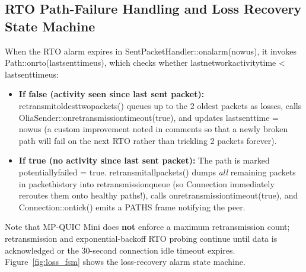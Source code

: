 \documentclass[10pt,a4paper]{article}
\newcommand{\codeul}{\textunderscore\hspace{0pt}}
\DeclareRobustCommand{\code}[1]{{\ttfamily\let\_\codeul #1}}
\begin{document}
\subsection{RTO Path-Failure Handling and Loss Recovery State Machine}
When the RTO alarm expires in \code{SentPacketHandler::on\_alarm(now\_us)}, it invokes \code{Path::on\_rto(last\_sent\_time\_us)}, which checks whether \code{last\_network\_activity\_time < last\_sent\_time\_us}:
\begin{itemize}
    \item \textbf{If false (activity seen since last sent packet):} \code{retransmit\_oldest\_two\_packets()} queues up to the 2 oldest packets as losses, calls \code{OliaSender::on\_retransmission\_timeout(true)}, and updates \code{last\_sent\_time = now\_us} (a custom improvement noted in comments so that a newly broken path will fail on the next RTO rather than trickling 2 packets forever).
    \item \textbf{If true (no activity since last sent packet):} The path is marked \code{potentially\_failed = true}. \code{retransmit\_all\_packets()} dumps \emph{all} remaining packets in \code{packet\_history} into \code{retransmission\_queue} (so \code{Connection} immediately reroutes them onto healthy paths!), calls \code{on\_retransmission\_timeout(true)}, and \code{Connection::on\_tick()} emits a \code{PATHS} frame notifying the peer.
\end{itemize}
Note that MP-QUIC Mini does \textbf{not} enforce a maximum retransmission count; retransmission and exponential-backoff RTO probing continue until data is acknowledged or the 30-second connection idle timeout expires. Figure~\ref{fig:loss_fsm} shows the loss-recovery alarm state machine.
\end{document}
